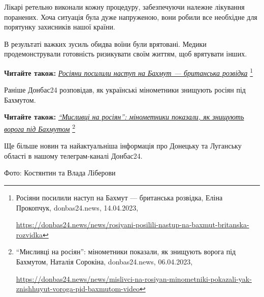 Лікарі ретельно виконали кожну процедуру, забезпечуючи належне лікування
поранених. Хоча ситуація була дуже напруженою, вони робили все необхідне для
порятунку захисників нашої країни.


В результаті важких зусиль обидва воїни були врятовані. Медики продемонстрували
готовність ризикувати своїм життям, щоб врятувати інших.

\textbf{Читайте також:} \href{https://donbas24.news/news/rosiyani-posilili-nastup-na-baxmut-britanska-rozvidka}{\emph{Росіяни посилили наступ на Бахмут — британська розвідка}}%
\footnote{Росіяни посилили наступ на Бахмут — британська розвідка, Еліна Прокопчук, donbas24.news, 14.04.2023, \par%
\url{https://donbas24.news/news/rosiyani-posilili-nastup-na-baxmut-britanska-rozvidka}%
}


Раніше Донбас24 розповідав, як українські мінометники знищують росіян під
Бахмутом.

\textbf{Читайте також:} \href{https://donbas24.news/news/mislivci-na-rosiyan-minometniki-pokazali-yak-znishhuyut-voroga-pid-baxmutom-video}{\emph{\enquote{Мисливці на росіян}: мінометники показали, як знищують ворога під Бахмутом}}%
\footnote{\enquote{Мисливці на росіян}: мінометники показали, як знищують ворога під Бахмутом, Наталія Сорокіна, donbas24.news, 06.04.2023, \par%
\url{https://donbas24.news/news/mislivci-na-rosiyan-minometniki-pokazali-yak-znishhuyut-voroga-pid-baxmutom-video}%
}

Ще більше новин та найактуальніша інформація про Донецьку та Луганську області
в нашому телеграм-каналі Донбас24.

Фото: Костянтин та Влада Ліберови
